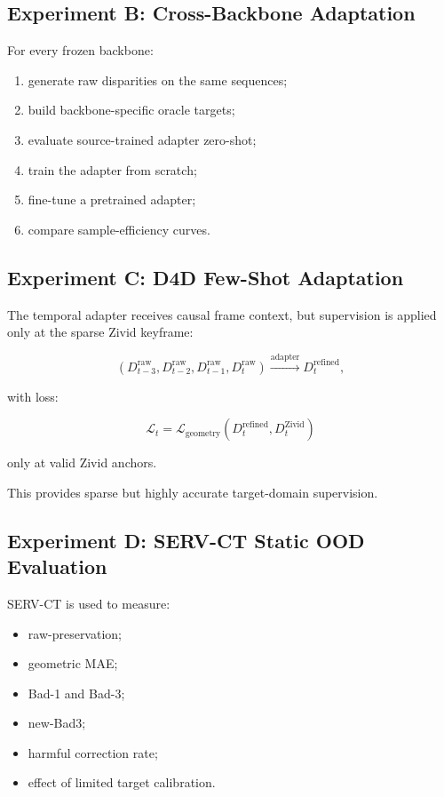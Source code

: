 \documentclass[11pt,a4paper]{article}
\begin{document}
\subsection{Experiment B: Cross-Backbone Adaptation}

For every frozen backbone:

\begin{enumerate}[leftmargin=*]
    \item generate raw disparities on the same sequences;
    \item build backbone-specific oracle targets;
    \item evaluate source-trained adapter zero-shot;
    \item train the adapter from scratch;
    \item fine-tune a pretrained adapter;
    \item compare sample-efficiency curves.
\end{enumerate}

\subsection{Experiment C: D4D Few-Shot Adaptation}

The temporal adapter receives causal frame context, but supervision is applied only
at the sparse Zivid keyframe:

\begin{equation}
\left(
D_{t-3}^{\mathrm{raw}},
D_{t-2}^{\mathrm{raw}},
D_{t-1}^{\mathrm{raw}},
D_t^{\mathrm{raw}}
\right)
\xrightarrow{\text{adapter}}
D_t^{\mathrm{refined}},
\end{equation}

with loss:

\begin{equation}
\mathcal{L}_t =
\mathcal{L}_{\mathrm{geometry}}
\left(
D_t^{\mathrm{refined}},
D_t^{\mathrm{Zivid}}
\right)
\end{equation}

only at valid Zivid anchors.

This provides sparse but highly accurate target-domain supervision.

\subsection{Experiment D: SERV-CT Static OOD Evaluation}

SERV-CT is used to measure:

\begin{itemize}[leftmargin=*]
    \item raw-preservation;
    \item geometric MAE;
    \item Bad-1 and Bad-3;
    \item new-Bad3;
    \item harmful correction rate;
    \item effect of limited target calibration.
\end{itemize}
\end{document}

